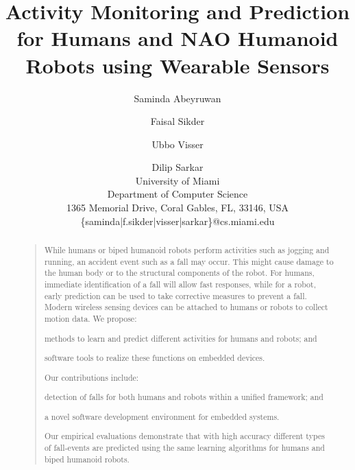 \documentclass[letterpaper]{article}
\begin{document}
 \begin{sloppy}
%
\title{Activity Monitoring and Prediction for Humans and NAO Humanoid Robots using 
Wearable Sensors}
\author{Saminda Abeyruwan \and Faisal Sikder \and Ubbo Visser \and Dilip Sarkar\\
 University of Miami \\
Department of Computer Science\\
 1365 Memorial Drive, Coral Gables, FL, 33146, USA\\
{\ttfamily \{saminda|f.sikder|visser|sarkar\}@cs.miami.edu}
}
\maketitle
\begin{abstract}
\begin{quote}
While humans or biped humanoid robots perform activities such as jogging and running, an accident 
event such as a fall may occur. This might cause damage to the human body or 
to the structural components of the robot. For humans, immediate identification of a fall 
will allow fast responses, while for a robot, early prediction can be used to take corrective 
measures to prevent a fall. Modern wireless sensing devices can be attached to humans or robots to 
collect motion data. We propose: \begin{inparaenum}[1)] \item 
methods to learn and predict different activities for humans and robots; and \item software 
tools to realize these functions  on embedded devices. \end{inparaenum} Our contributions include: 
\begin{inparaenum}[1)] \item detection of falls for both humans and robots within a unified 
framework; and \item  a  novel software development environment for embedded systems. 
\end{inparaenum} Our empirical evaluations demonstrate that with high accuracy different types of  
fall-events are predicted using the same learning algorithms for humans and biped humanoid robots. 
\end{quote}
\end{abstract}


\end{sloppy}
\end{document}
